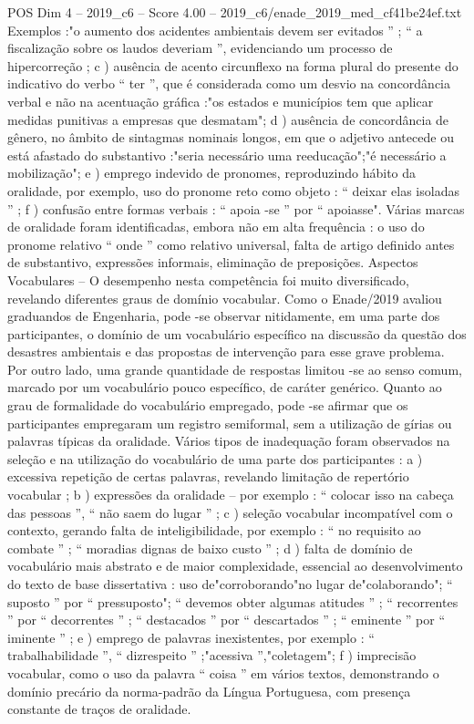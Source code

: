 \begin{textsample}{POS Dim 4 – 2019\_c6 – Score 4.00 – 2019\_c6/enade\_2019\_med\_cf41be24ef.txt}
Exemplos :"o aumento dos acidentes ambientais devem ser evitados ” ; “ a fiscalização sobre os laudos deveriam ”, evidenciando um processo de hipercorreção ; c ) ausência de acento circunflexo na forma plural do presente do indicativo do verbo “ ter ”, que é considerada como um desvio na concordância verbal e não na acentuação gráfica :"os estados e municípios tem que aplicar medidas punitivas a empresas que desmatam"; d ) ausência de concordância de gênero, no âmbito de sintagmas nominais longos, em que o adjetivo antecede ou está afastado do substantivo :"seria necessário uma reeducação";"é necessário a mobilização"; e ) emprego indevido de pronomes, reproduzindo hábito da oralidade, por exemplo, uso do pronome reto como objeto : “ deixar elas isoladas ” ; f ) confusão entre formas verbais : “ apoia -se ” por “ apoiasse".
Várias marcas de oralidade foram identificadas, embora não em alta frequência : o uso do pronome relativo “ onde ” como relativo universal, falta de artigo definido antes de substantivo, expressões informais, eliminação de preposições.
Aspectos Vocabulares – O desempenho nesta competência foi muito diversificado, revelando diferentes graus de domínio vocabular.
Como o Enade/2019 avaliou graduandos de Engenharia, pode -se observar nitidamente, em uma parte dos participantes, o domínio de um vocabulário específico na discussão da questão dos desastres ambientais e das propostas de intervenção para esse grave problema.
Por outro lado, uma grande quantidade de respostas limitou -se ao senso comum, marcado por um vocabulário pouco específico, de caráter genérico.
Quanto ao grau de formalidade do vocabulário empregado, pode -se afirmar que os participantes empregaram um registro semiformal, sem a utilização de gírias ou palavras típicas da oralidade.
Vários tipos de inadequação foram observados na seleção e na utilização do vocabulário de uma parte dos participantes : a ) excessiva repetição de certas palavras, revelando limitação de repertório vocabular ; b ) expressões da oralidade – por exemplo : “ colocar isso na cabeça das pessoas ”, “ não saem do lugar ” ; c ) seleção vocabular incompatível com o contexto, gerando falta de inteligibilidade, por exemplo : “ no requisito ao combate ” ; “ moradias dignas de baixo custo ” ; d ) falta de domínio de vocabulário mais abstrato e de maior complexidade, essencial ao desenvolvimento do texto de base dissertativa : uso de"corroborando"no lugar de"colaborando"; “ suposto ” por “ pressuposto"; “ devemos obter algumas atitudes ” ; “ recorrentes ” por “ decorrentes ” ; “ destacados ” por “ descartados ” ; “ eminente ” por “ iminente ” ; e ) emprego de palavras inexistentes, por exemplo : “ trabalhabilidade ”, “ dizrespeito ” ;"acessiva ”,"coletagem"; f ) imprecisão vocabular, como o uso da palavra “ coisa ” em vários textos, demonstrando o domínio precário da norma-padrão da Língua Portuguesa, com presença constante de traços de oralidade.

\end{textsample}
